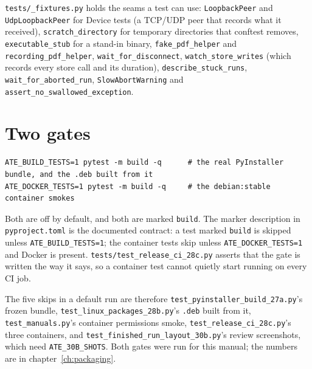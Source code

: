 \texttt{tests/\_fixtures.py} holds the seams a test can use: \texttt{LoopbackPeer} and
\texttt{UdpLoopbackPeer} for Device tests (a TCP/UDP peer that records what it received),
\texttt{scratch\_directory} for temporary directories that conftest removes,
\texttt{executable\_stub} for a stand-in binary, \texttt{fake\_pdf\_helper} and
\texttt{recording\_\allowbreak{}pdf\_\allowbreak{}helper}, \texttt{wait\_\allowbreak{}for\_\allowbreak{}disconnect}, \texttt{watch\_store\_writes} (which
records every store call and its duration), \texttt{describe\_\allowbreak{}stuck\_\allowbreak{}runs},
\texttt{wait\_\allowbreak{}for\_\allowbreak{}aborted\_\allowbreak{}run}, \texttt{SlowAbortWarning} and
\texttt{assert\_\allowbreak{}no\_\allowbreak{}swallowed\_\allowbreak{}exception}.

\section{Two gates}

\begin{lstlisting}[language=ATEShell]
ATE_BUILD_TESTS=1 pytest -m build -q      # the real PyInstaller bundle, and the .deb built from it
ATE_DOCKER_TESTS=1 pytest -m build -q     # the debian:stable container smokes
\end{lstlisting}

Both are off by default, and both are marked \texttt{build}. The marker description in
\texttt{pyproject.toml} is the documented contract: a test marked \texttt{build} is skipped unless
\texttt{ATE\_BUILD\_TESTS=1}; the container tests skip unless \texttt{ATE\_DOCKER\_TESTS=1} and Docker is
present. \texttt{tests/\allowbreak{}test\_\allowbreak{}release\_\allowbreak{}ci\_\allowbreak28c.py} asserts that the gate is written the way it says, so a
container test cannot quietly start running on every CI job.

The five skips in a default run are therefore
\texttt{test\_\allowbreak{}pyinstaller\_\allowbreak{}build\_\allowbreak27a.py}'s frozen bundle,
\texttt{test\_\allowbreak{}linux\_\allowbreak{}packages\_\allowbreak28b.py}'s \texttt{.deb} built from it,
\texttt{test\_\allowbreak{}manuals.py}'s container permissions smoke,
\texttt{test\_\allowbreak{}release\_\allowbreak{}ci\_\allowbreak28c.py}'s three containers, and
\texttt{test\_\allowbreak{}finished\_\allowbreak{}run\_\allowbreak{}layout\_\allowbreak30b.py}'s review screenshots, which need
\texttt{ATE\_\allowbreak{}30B\_\allowbreak{}SHOTS}. Both gates were run for this manual; the numbers are in
chapter~\ref{ch:packaging}.


